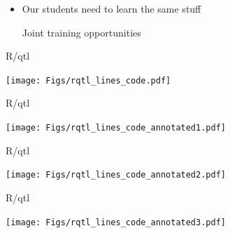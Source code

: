 \documentclass[12pt]{article}
\newcommand{\headsize}{\fontsize{35}{35} \selectfont}
\newcommand{\smallersize}{\fontsize{20}{25} \selectfont}
\begin{document}
{\begin{minipage}{10in}
\begin{itemize}
 \item Our students need to learn the same stuff

   {\smallersize \color{myblue} Joint training opportunities}

 \end{itemize}
 \end{minipage}



\newpage


\headsize \color{myyellow}
\hfill \begin{minipage}{5.75in}
\centering
R/qtl
\end{minipage}

\vfill

\centerline{\texttt{[image: Figs/rqtl\_lines\_code.pdf]}}

\vspace{15mm}


\newpage

\addtocounter{page}{-1}

\headsize \color{myyellow}
\hfill \begin{minipage}{5.75in}
\centering
R/qtl
\end{minipage}

\vfill

\centerline{\texttt{[image: Figs/rqtl\_lines\_code\_annotated1.pdf]}}

\vspace{15mm}


\newpage

\addtocounter{page}{-1}

\headsize \color{myyellow}
\hfill \begin{minipage}{5.75in}
\centering
R/qtl
\end{minipage}

\vfill

\centerline{\texttt{[image: Figs/rqtl\_lines\_code\_annotated2.pdf]}}

\vspace{15mm}


\newpage

\addtocounter{page}{-1}

\headsize \color{myyellow}
\hfill \begin{minipage}{5.75in}
\centering
R/qtl
\end{minipage}

\vfill

\centerline{\texttt{[image: Figs/rqtl\_lines\_code\_annotated3.pdf]}}

}
\end{document}
